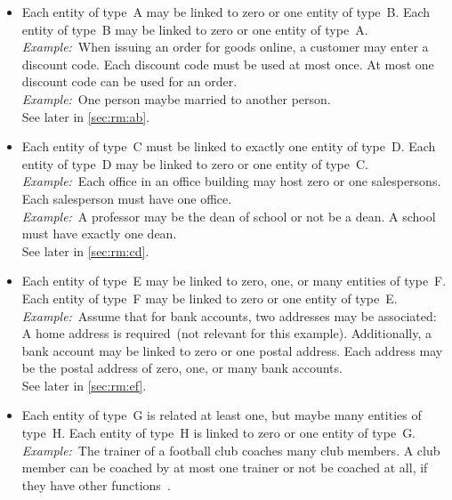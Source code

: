 \begin{itemize}%
%
\item {} %
Each entity of type~A may be linked to zero or one entity of type~B.
Each entity of type~B may be linked to zero or one entity of type~A.~\cite{BS2023G:CFNIERD}\\%
\emph{Example:}~When issuing an order for goods online, a customer may enter a discount code.
Each discount code must be used at most once.
At most one discount code can be used for an order.~\cite{BS2023G:CFNIERD}\\%
\emph{Example:}~One person maybe married to another person.~\cite{R2024CDS:E}\\%
See later in \cref{sec:rm:ab}.%
%
\item {}
Each entity of type~C must be linked to exactly one entity of type~D.
Each entity of type~D may be linked to zero or one entity of type~C.~\cite{T2025CDBMS:ERM}\\%
\emph{Example:}~Each office in an office building may host zero or one salespersons.
Each salesperson must have one office.~\cite{T2025CDBMS:ERM}\\%
\emph{Example:}~A professor may be the dean of school or not be a dean.
A school must have exactly one dean.~\cite{R2024CDS:E}\\%
See later in \cref{sec:rm:cd}.%
%
\item {}
Each entity of type~E may be linked to zero, one, or many entities of type~F.
Each entity of type~F may be linked to zero or one entity of type~E.~\cite{MA2006MAC:DMERDED}\\%
\emph{Example:}~Assume that for bank accounts, two addresses may be associated:
A home address is required~(not relevant for this example).
Additionally, a bank account may be linked to zero or one postal address.
Each address may be the postal address of zero, one, or many bank accounts.~\cite{MA2006MAC:DMERDED}\\%
See later in \cref{sec:rm:ef}.%
%
\item {}
Each entity of type~G is related at least one, but maybe many entities of type~H.
Each entity of type~H is linked to zero or one entity of type~G.\\%
\emph{Example:}~The trainer of a football club coaches many club members.
A club member can be coached by at most one trainer or not be coached at all, if they have other functions~\cite{SE:DA:2020UTFBRTCACFE}.\\%

\end{itemize}
